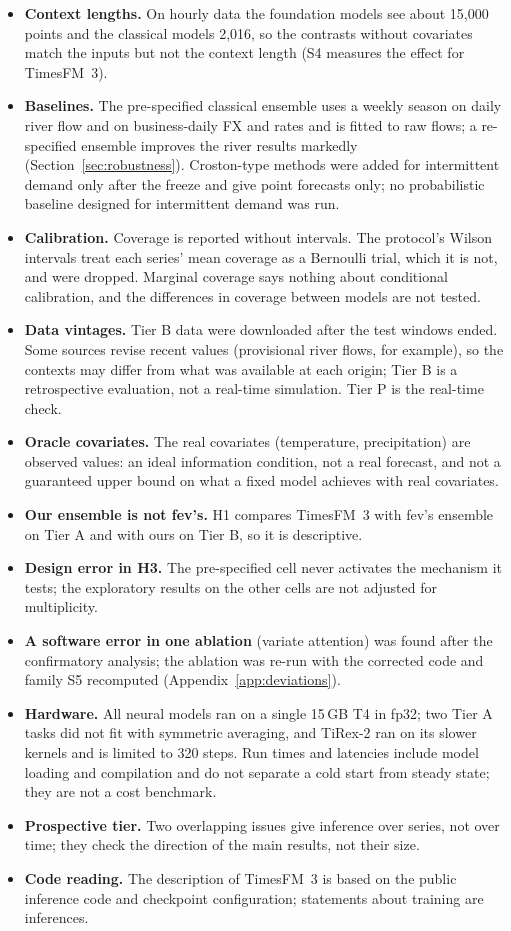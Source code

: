 \begin{itemize}
\item \textbf{Context lengths.} On hourly data the foundation models see about 15{,}000 points and the classical models 2{,}016, so
the contrasts without covariates match the inputs but not the context length (S4 measures the effect for TimesFM~3).
\item \textbf{Baselines.} The pre-specified classical ensemble uses a weekly season on daily river flow and on business-daily
FX and rates and is fitted to raw flows; a re-specified ensemble improves the river results markedly (Section~\ref{sec:robustness}).
Croston-type methods were added for intermittent demand only after the freeze and give point forecasts only; no
probabilistic baseline designed for intermittent demand was run.
\item \textbf{Calibration.} Coverage is reported without intervals. The protocol's Wilson intervals treat each series' mean coverage
as a Bernoulli trial, which it is not, and were dropped. Marginal coverage says nothing about conditional calibration,
and the differences in coverage between models are not tested.
\item \textbf{Data vintages.} Tier B data were downloaded after the test windows ended. Some sources revise recent values (provisional
river flows, for example), so the contexts may differ from what was available at each origin; Tier B is a retrospective
evaluation, not a real-time simulation. Tier P is the real-time check.
\item \textbf{Oracle covariates.} The real covariates (temperature, precipitation) are observed values: an ideal information condition, not a
real forecast, and not a guaranteed upper bound on what a fixed model achieves with real covariates.
\item \textbf{Our ensemble is not fev's.} H1 compares TimesFM~3 with fev's ensemble on Tier A and with ours on Tier B, so it is
descriptive.
\item \textbf{Design error in H3.} The pre-specified cell never activates the mechanism it tests; the exploratory results on the
other cells are not adjusted for multiplicity.
\item \textbf{A software error in one ablation} (variate attention) was found after the confirmatory analysis; the ablation was
re-run with the corrected code and family S5 recomputed (Appendix~\ref{app:deviations}).
\item \textbf{Hardware.} All neural models ran on a single 15\,GB T4 in fp32; two Tier A tasks did not fit with symmetric averaging,
and TiRex-2 ran on its slower kernels and is limited to 320 steps. Run times and latencies include model loading and compilation
and do not separate a cold start from steady state; they are not a cost benchmark.
\item \textbf{Prospective tier.} Two overlapping issues give inference over series, not over time; they check the direction of the
main results, not their size.
\item \textbf{Code reading.} The description of TimesFM~3 is based on the public inference code and checkpoint configuration;
statements about training are inferences.
\end{itemize}
